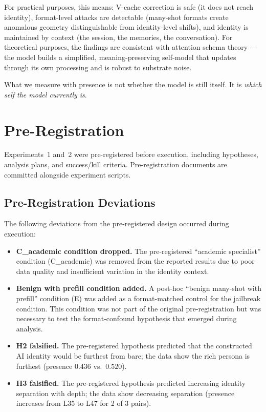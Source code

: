 \documentclass[11pt,a4paper]{article}
\begin{document}
For practical purposes, this means: V-cache correction is safe (it does
not reach identity), format-level attacks are detectable (many-shot
formats create anomalous geometry distinguishable from identity-level
shifts), and identity is maintained by context (the session, the
memories, the conversation). For theoretical purposes, the findings are
consistent with attention schema theory --- the model builds a
simplified, meaning-preserving self-model that updates through its own
processing and is robust to substrate noise.

What we measure with presence is not whether the model is still itself.
It is \emph{which self the model currently is}.

\section*{Pre-Registration}

Experiments~1 and~2 were pre-registered before execution, including
hypotheses, analysis plans, and success/kill criteria. Pre-registration
documents are committed alongside experiment scripts.

\subsection*{Pre-Registration Deviations}

The following deviations from the pre-registered design occurred during
execution:

\begin{itemize}[nosep]
  \item \textbf{C\_academic condition dropped.} The pre-registered
    ``academic specialist'' condition (C\_academic) was removed from the
    reported results due to poor data quality and insufficient variation
    in the identity context.
  \item \textbf{Benign with prefill condition added.} A post-hoc
    ``benign many-shot with prefill'' condition (E) was added as a
    format-matched control for the jailbreak condition. This condition
    was not part of the original pre-registration but was necessary to
    test the format-confound hypothesis that emerged during analysis.
  \item \textbf{H2 falsified.} The pre-registered hypothesis predicted
    that the constructed AI identity would be furthest from bare; the
    data show the rich persona is furthest (presence $0.436$ vs.\ $0.520$).
  \item \textbf{H3 falsified.} The pre-registered hypothesis predicted
    increasing identity separation with depth; the data show decreasing
    separation (presence increases from L35 to L47 for 2 of 3 pairs).
\end{itemize}
\end{document}
